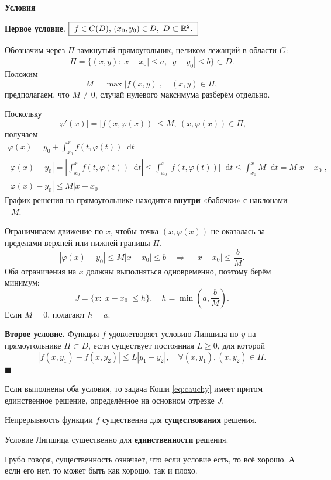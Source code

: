 \documentclass[12pt,a4paper]{article}
\numberwithin{equation}{section}
\newcommand{\dd}{\mathop{}\!\mathrm{d}}
\renewenvironment{proof}[1][Доказательство]{\begin{center}\textbf{#1}\end{center}}{\hfill$\blacksquare$\par}
\begin{document}
\begin{proof}[Условия]
\textbf{Первое условие}. $\boxed{\ f\in C(D)$, $(x_0,y_0)\in D,\ D\subset\mathbb{R}^2.\ }$

Обозначим через \(\Pi\) замкнутый прямоугольник, целиком лежащий в области \(G\):
\[
\Pi=\{(x,y):|x-x_0|\le a,\ |y-y_0|\le b\}\subset D.
\]
Положим
\[
M=\max|f(x,y)|,\quad (x,y)\in\Pi,
\]
предполагаем, что $M\neq0$, случай нулевого максимума разберём отдельно.

Поскольку
\[|\varphi'(x)|=|f(x,\varphi(x))|\le M,\ (x,\varphi(x))\in\Pi,\]
получаем
\begin{gather*}
\varphi(x)=y_0+\int_{x_0}^{x}f(t,\varphi(t))\dd t\\[1em]
|\varphi(x)-y_0|=\left|\int_{x_0}^{x}f(t,\varphi(t))\dd t\right|\le\int_{x_0}^{x}|f(t,\varphi(t))|\dd t\le\int_{x_0}^{x} M\dd t=M|x-x_0|,\\[1em]
|\varphi(x)-y_0|\le M|x-x_0|
\end{gather*}
График решения \underline{на прямоугольнике} находится \textbf{внутри} «бабочки» с наклонами \(\pm M\).

Ограничиваем движение по \(x\), чтобы точка \((x,\varphi(x))\) не оказалась за пределами верхней или нижней границы \(\Pi\).
\[|\varphi(x)-y_0|\le M|x-x_0|\le b\quad\Longrightarrow\quad |x-x_0|\le\frac{b}{M}.\]
Оба ограничения на \(x\) должны выполняться одновременно, поэтому берём минимум:
\[J=\{x:|x-x_0|\le h\},\quad h=\min\left(a,\frac{b}{M}\right).\]
Если \(M=0\), полагают \(h=a\).

\textbf{Второе условие.} Функция $f$ удовлетворяет условию Липшица
по $y$ на прямоугольнике $\Pi\subset D$, если существует постоянная
$L\ge0$, для которой
\[
|f(x,y_1)-f(x,y_2)|\le L|y_1-y_2|,\quad\forall(x,y_1),(x,y_2)\in\Pi.
\]
\end{proof}
Если выполнены оба условия, то задача Коши \eqref{eq:cauchy} имеет притом единственное решение, определённое на основном отрезке $J$.

Непрерывность функции \(f\) существенна для \textbf{существования} решения.

Условие Липшица существенно для \textbf{единственности} решения.

Грубо говоря, существенность означает, что если условие есть, то всё хорошо. А если его нет, то может быть как хорошо, так и плохо.
\end{document}
